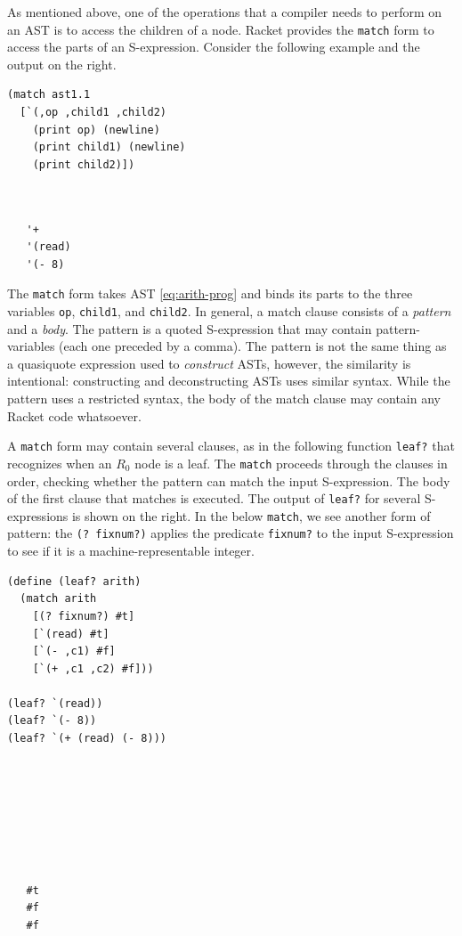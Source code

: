\documentclass[11pt]{book}
\begin{document}
As mentioned above, one of the operations that a compiler needs to
perform on an AST is to access the children of a node.  Racket
provides the \texttt{match} form to access the parts of an
S-expression. Consider the following example and the output on the
right.
\begin{center}
\begin{minipage}{0.5\textwidth}
\begin{lstlisting}
(match ast1.1
  [`(,op ,child1 ,child2)
    (print op) (newline)
    (print child1) (newline)
    (print child2)])
\end{lstlisting}
\end{minipage}
\vrule
\begin{minipage}{0.25\textwidth}
\begin{lstlisting}


   '+
   '(read)
   '(- 8)
\end{lstlisting}
\end{minipage}
\end{center}
The \texttt{match} form takes AST \eqref{eq:arith-prog} and binds its
parts to the three variables \texttt{op}, \texttt{child1}, and
\texttt{child2}. In general, a match clause consists of a
\emph{pattern} and a \emph{body}. The pattern is a quoted S-expression
that may contain pattern-variables (each one preceded by a comma).
%
The pattern is not the same thing as a quasiquote expression used to
\emph{construct} ASTs, however, the similarity is intentional: constructing and
deconstructing ASTs uses similar syntax.
%
While the pattern uses a restricted syntax, 
the body of the match clause may contain any Racket code whatsoever.


A \texttt{match} form may contain several clauses, as in the following
function \texttt{leaf?} that recognizes when an $R_0$ node is
a leaf. The \texttt{match} proceeds through the clauses in order,
checking whether the pattern can match the input S-expression. The
body of the first clause that matches is executed. The output of
\texttt{leaf?} for several S-expressions is shown on the right. In the
below \texttt{match}, we see another form of pattern: the \texttt{(?
  fixnum?)} applies the predicate \texttt{fixnum?} to the input
S-expression to see if it is a machine-representable integer.
\begin{center}
\begin{minipage}{0.5\textwidth}
\begin{lstlisting}
(define (leaf? arith)
  (match arith
    [(? fixnum?) #t]
    [`(read) #t]
    [`(- ,c1) #f]
    [`(+ ,c1 ,c2) #f]))

(leaf? `(read))
(leaf? `(- 8))
(leaf? `(+ (read) (- 8)))
\end{lstlisting}
\end{minipage}
\vrule
\begin{minipage}{0.25\textwidth}
  \begin{lstlisting}
    






   #t
   #f
   #f
\end{lstlisting}
\end{minipage}
\end{center}
\end{document}

